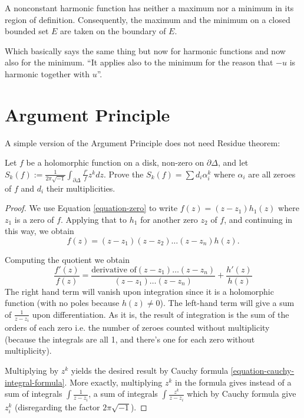 \begin{theorem}
\label{theorem-maximum-principle-harmonic}
A nonconstant harmonic function has
neither a maximum nor a minimum in its region
of definition.
Consequently, the maximum and the minimum
on a closed bounded set $E$ are taken on the
boundary of $E$.
\end{theorem}

\noindent
Which basically says the same thing but now
for harmonic functions
and now also for the minimum.
``It applies also to the minimum
for the reason that $-u$ is harmonic together
with $u$''.


\section{Argument Principle}
\label{section-argument-principle}

\noindent
A simple version of the Argument Principle
does not need Residue theorem:

\begin{exercise}
\label{exercise-argument-principle}
Let $f$ be a holomorphic function on a disk,
non-zero on $\partial \Delta$, and
let
$S_k(f):=\frac{1}{2\pi\sqrt{-1}}
\int_{\partial\Delta}\frac{f'}{f}z^kdz$.
Prove the $S_k(f)=\sum d_i\alpha_i^k$ where
$\alpha_i$ are all zeroes of $f$ and
$d_i$ their multiplicities.
\end{exercise}

\begin{proof}
We use Equation \ref{equation-zero} to write
$f(z)=(z-z_1)h_1(z)$ where $z_1$ is a zero of
$f$.
Applying that to $h_1$ for another zero
$z_2$ of $f$,
and continuing in this way, we obtain
\begin{equation}
\label{equation-factor-zeroes}
f(z)=(z-z_1)(z-z_2)\ldots(z-z_n)h(z).
\end{equation}

\noindent
Computing the quotient we obtain
$$
\frac{f'(z)}{f(z)}=\frac{\text{derivative of
$(z-z_1)\ldots(z-z_n)$}}{(z-z_1)\ldots(z-z_n)
}+\frac{h'(z)}{h(z)}
$$
The right hand term will vanish upon
integration since it is a holomorphic
function (with no poles because $h(z)\neq
0$). The left-hand term will give a
sum of $\frac{1}{z-z_i}$ upon
differentiation. As it is, the result of
integration is the sum of the orders of each
zero i.e. the number of zeroes
counted without multiplicity
(because the integrals are all 1, and there's
one for each zero without
multiplicity).

Multiplying by $z^k$ yields the desired
result by Cauchy formula
\ref{equation-cauchy-integral-formula}. More
exactly,
multiplying $z^k$ in the formula gives
instead of a sum
of integrals $\int \frac{1}{z-z_i}$, a sum of
integrals
$\int\frac{z^k}{z-z_i}$ which by Cauchy
formula give $z_i^k$
(disregarding the factor $2\pi\sqrt{-1}$).
\end{proof}

